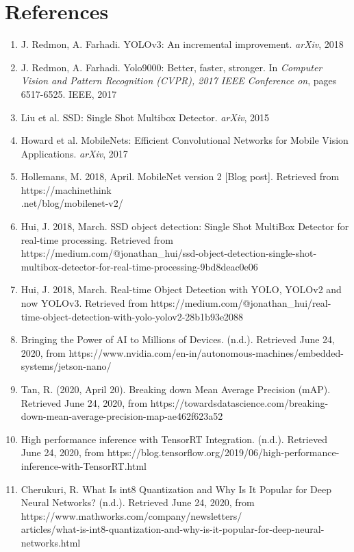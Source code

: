 \documentclass[12pt,letterpaper]{article}
\begin{document}

\section*{References}
\label{sec:refer}

\begin{enumerate}

    \item J. Redmon, A. Farhadi. YOLOv3: An incremental improvement. \textit{arXiv}, 2018 

    \item J. Redmon, A. Farhadi. Yolo9000: Better, faster, stronger. In \textit{Computer Vision and Pattern Recognition (CVPR), 2017 IEEE Conference on}, pages 6517-6525. IEEE, 2017

    \item Liu et al. SSD: Single Shot Multibox Detector. \textit{arXiv}, 2015
    
    \item Howard et al. MobileNets: Efficient Convolutional Networks for Mobile Vision Applications. \textit{arXiv}, 2017

    \item Hollemans, M. 2018, April. MobileNet version 2 [Blog post]. Retrieved from https://machinethink \\.net/blog/mobilenet-v2/

    \item Hui, J. 2018, March. SSD object detection: Single Shot MultiBox Detector for real-time processing. Retrieved from https://medium.com/@jonathan\_hui/ssd-object-detection-single-shot-multibox-detector-for-real-time-processing-9bd8deac0e06

    \item Hui, J. 2018, March. Real-time Object Detection with YOLO, YOLOv2 and now YOLOv3. Retrieved from https://medium.com/@jonathan\_hui/real-time-object-detection-with-yolo-yolov2-28b1b93e2088

    \item Bringing the Power of AI to Millions of Devices. (n.d.). Retrieved June 24, 2020, from https://www.nvidia.com/en-in/autonomous-machines/embedded-systems/jetson-nano/

    \item Tan, R. (2020, April 20). Breaking down Mean Average Precision (mAP). Retrieved June 24, 2020, from https://towardsdatascience.com/breaking-down-mean-average-precision-map-ae462f623a52

    \item High performance inference with TensorRT Integration. (n.d.). Retrieved June 24, 2020, from https://blog.tensorflow.org/2019/06/high-performance-inference-with-TensorRT.html

    \item Cherukuri, R. What Is int8 Quantization and Why Is It Popular for Deep Neural Networks? (n.d.). Retrieved June 24, 2020, from https://www.mathworks.com/company/newsletters/ \\ articles/what-is-int8-quantization-and-why-is-it-popular-for-deep-neural-networks.html


\end{enumerate}
\end{document}
